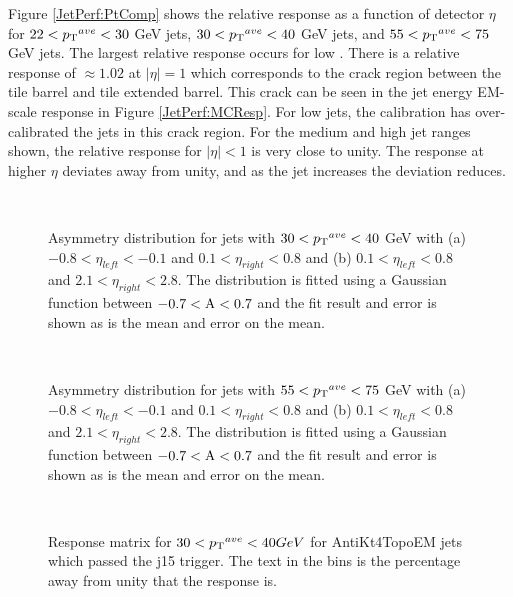 Figure \ref{JetPerf:PtComp} shows the relative response as a function of detector $\eta$ for $22<\mbox{$\mbox{$p_{\rm T}$}{}^{ave}$}{}<30$ GeV jets, $30<\mbox{$\mbox{$p_{\rm T}$}{}^{ave}$}{}<40$ GeV jets, and $55<\mbox{$\mbox{$p_{\rm T}$}{}^{ave}$}{}<75$ GeV jets. 
The largest relative response occurs for low \ptave{}.
There is a relative response of $\approx1.02$ at $|\eta|=1$ which corresponds to the crack region between the tile barrel and tile extended barrel. 
This crack can be seen in the jet energy EM-scale response in Figure \ref{JetPerf:MCResp}.
For low \pt{} jets, the calibration has over-calibrated the jets in this crack region. 
For the medium and high jet \pt{} ranges shown, the relative response for $|\eta|<1$ is very close to unity.
The response at higher $\eta{}$ deviates away from unity, and as the jet \pt{} increases the deviation reduces. 
\begin{figure}
\centering
\mbox{
}
\caption[]{
Asymmetry distribution for jets with $30<\mbox{$\mbox{$p_{\rm T}$}{}^{ave}$}{}<40$ GeV with (a) $-0.8<\eta_{left}<-0.1$ and $0.1<\eta_{right}<0.8$ and (b)  $0.1<\eta_{left}<0.8$ and $2.1<\eta_{right}<2.8$.
The distribution is fitted using a Gaussian function between $\rm{-0.7<A<0.7}$ and the fit result and error is shown as is the mean and error on the mean. 
\label{JetPerf:Asym_j15}}
\end{figure}

\begin{figure}
\centering
\mbox{
}
\caption[]{
Asymmetry distribution for jets with $55<\mbox{$\mbox{$p_{\rm T}$}{}^{ave}$}{}<75$ GeV with (a) $-0.8<\eta_{left}<-0.1$ and $0.1<\eta_{right}<0.8$ and (b)  $0.1<\eta_{left}<0.8$ and $2.1<\eta_{right}<2.8$.
The distribution is fitted using a Gaussian function between $\rm{-0.7<A<0.7}$ and the fit result and error is shown as is the mean and error on the mean. 
\label{JetPerf:Asym_j30}}
\end{figure}

\begin{figure}
\centering
\mbox{
}
\caption[]{
Response matrix for $30<\mbox{$\mbox{$p_{\rm T}$}{}^{ave}$}{}<40GeV$ for AntiKt4TopoEM jets which passed the j15 trigger. 
The text in the bins is the percentage away from unity that the response is.
\label{JetPerf:ResponseMatrix_30_40_j15}}
\end{figure}

